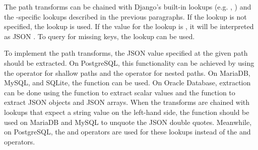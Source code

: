 The path transforms can be chained with Django's built-in lookups (e.g.
, ) and the -specific lookups
described in the previous paragraphs. If the lookup is not specified, the
 lookup is used. If the value for the  lookup is
, it will be interpreted as JSON . To query for missing
keys, the  lookup can be used.

To implement the path transforms, the JSON value specified at the given path
should be extracted. On PostgreSQL, this functionality can be achieved by using
the \code{->} operator for shallow paths and the \code{\#>} operator for nested
paths. On MariaDB, MySQL, and SQLite, the  function can be
used. On Oracle Database, extraction can be done using the 
function to extract scalar values and the  function to
extract JSON objects and JSON arrays. When the transforms are chained with
lookups that expect a string value on the left-hand side, the
 function should be used on MariaDB and MySQL to unquote
the JSON double quotes. Meanwhile, on PostgreSQL, the \code{->>} and
\code{\#>>} operators are used for these lookups instead of the \code{->} and
\code{\#>} operators.
